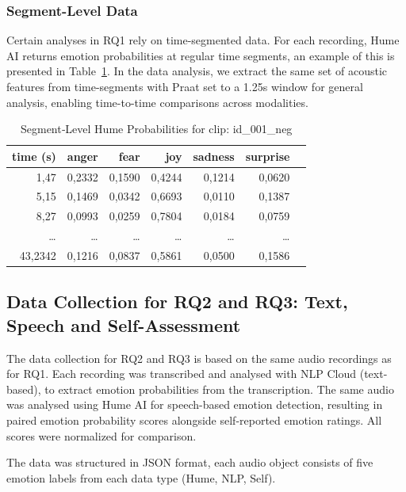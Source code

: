 \subsubsection{Segment-Level Data}
Certain analyses in RQ1 rely on time-segmented data. For each recording, Hume AI returns emotion probabilities at regular time segments, an example of this is presented in Table~\ref{tab:segments_hume_example}. 
In the data analysis, we extract the same set of acoustic features from time-segments with Praat set to a 1.25s window for general analysis, enabling time-to-time comparisons across modalities.
\begin{table}[H]
    \centering
    
    \begin{tabular}{rrrrrrl}
      \toprule
      \textbf{time (s)} & \textbf{anger} & \textbf{fear} & \textbf{joy} & \textbf{sadness} & \textbf{surprise} \\
      \midrule
      1,47    & 0,2332  & 0,1590 & 0,4244 & 0,1214 & 0,0620 \\
      5,15    & 0,1469  & 0,0342 & 0,6693 & 0,0110 & 0,1387 \\
      8,27    & 0,0993  & 0,0259 & 0,7804 & 0,0184 & 0,0759 \\
      \dots   & \dots   & \dots  & \dots  & \dots  & \dots  \\
      43,2342 & 0,1216  & 0,0837 & 0,5861 & 0,0500 & 0,1586 \\
      \bottomrule
    \end{tabular}
    \caption{Segment‐Level Hume Probabilities for clip: id\_001\_neg}
    \label{tab:segments_hume_example}
  \end{table}
  

\subsection{Data Collection for RQ2 and RQ3: Text, Speech and Self-Assessment}
\label{sec:datacoll_rq2_rq3}

The data collection for RQ2 and RQ3 is based on the same audio recordings as for RQ1. 
Each recording was transcribed and analysed with NLP Cloud (text-based), to extract emotion probabilities from the transcription. The same audio was analysed using Hume AI for speech-based emotion detection, resulting in paired emotion probability scores alongside self-reported emotion ratings. All scores were normalized for comparison.

The data was structured in JSON format, each audio object consists of five emotion labels from each data type (Hume, NLP, Self). 

